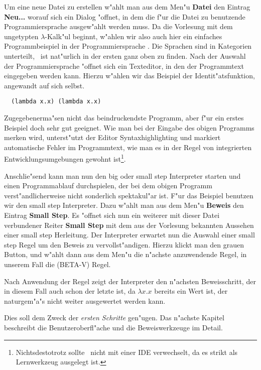 Um eine neue Datei zu erstellen w"ahlt man aus dem Men"u {\bf Datei} den Eintrag {\bf Neu...}
worauf sich ein Dialog "offnet, in dem die f"ur die Datei zu benutzende Programmiersprache
ausgew"ahlt werden muss. Da die Vorlesung mit dem ungetypten $\lambda$-Kalk"ul beginnt,
w"ahlen wir also auch hier ein einfaches Programmbeispiel in der Programmiersprache \LZERO.
Die Sprachen sind in Kategorien unterteilt, \LZERO\  ist nat"urlich in der ersten ganz oben zu finden.
Nach der Auswahl der Programmiersprache "offnet sich ein Texteditor, in den der Programmtext
eingegeben werden kann. Hierzu w"ahlen wir das Beispiel der Identit"atsfunktion, angewandt
auf sich selbst.
\begin{verbatim}
  (lambda x.x) (lambda x.x)
\end{verbatim}
Zugegebenerma"sen nicht das beindruckendste Programm, aber f"ur ein erstes Beispiel doch
sehr gut geeignet. Wie man bei der Eingabe des obigen Programms merken wird, unterst"utzt
der Editor Syntaxhighlighting und markiert automatische Fehler im Programmtext, wie man
es in der Regel von integrierten Entwicklungsumgebungen gewohnt ist\footnote{Nichtsdestotrotz
sollte \TPML\ nicht mit einer IDE verwechselt, da es strikt als Lernwerkzeug ausgelegt ist.}.

Anschlie"send kann man nun den big oder small step Interpreter starten und einen Programmablauf
durchspielen, der bei dem obigen Programm verst"andlicherweise nicht sonderlich spektakul"ar
ist. F"ur das Beispiel benutzen wir den small step Interpreter. Dazu w"ahlt man aus dem
Men"u {\bf Beweis} den Eintrag {\bf Small Step}. Es "offnet sich nun ein weiterer mit dieser
Datei verbundener Reiter {\bf Small Step} mit dem aus der Vorlesung bekannten Aussehen einer
small step Herleitung. Der Interpreter erwartet nun die Auswahl einer small step Regel um den
Beweis zu vervollst"andigen. Hierzu klickt man den grauen Button, und w"ahlt dann aus
dem Men"u die n"achste anzuwendende Regel, in unserem Fall die (BETA-V) Regel.

Nach Anwendung der Regel zeigt der Interpreter den n"achsten Beweisschritt, der in diesem
Fall auch schon der letzte ist, da $\lambda x.x$ bereits ein Wert ist, der naturgem"a"s
nicht weiter ausgewertet werden kann.

Dies soll dem Zweck der \emph{ersten Schritte} gen"ugen. Das n"achste Kapitel beschreibt
die Benutzeroberfl"ache und die Beweiswerkzeuge im Detail.



